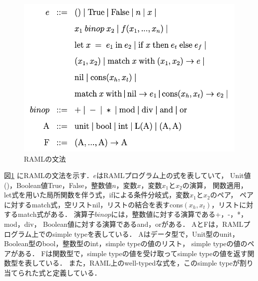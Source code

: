 \documentclass{kuisthesis}
\begin{document}
\begin{figure}[ht]
  \begin{center}
    \includegraphics[scale=0.8]{image2.png}
    \caption{RAMLの文法}
    \label{image2}
  \end{center}
\end{figure}

図\ref{image2} にRAMLの文法を示す．$e$はRAMLプログラム上の式を表していて，
Unit値()，Boolean値True，False，整数値$n$，変数$x$，変数$x_1$と$x_2$の演算，
関数適用，let式を用いた局所関数を伴う式，ifによる条件分岐式，変数$x_1$と$x_2$のペア，
ペアに対するmatch式，空リストnil，リストの結合を表すcons$(x_h,x_t)$，リストに対するmatch式がある．
演算子$binop$には，整数値に対する演算である+，-，*，mod，div，
Boolean値に対する演算であるand，orがある．
AとFは，RAMLプログラム上でのsimple typeを表している．
Aはデータ型で，Unit型のunit，Boolean型のbool，整数型のint，simple typeの値のリスト，
simple typeの値のペアがある．
Fは関数型で，simple typeの値を受け取ってsimple typeの値を返す関数型を表している．
また，RAML上のwell-typedな式を，このsimple typeが割り当てられた式と定義している．
\end{document}
